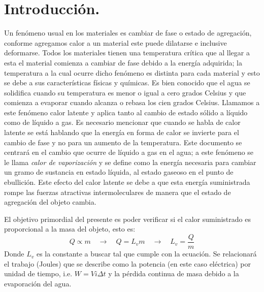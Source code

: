 \documentclass[a4paper]{article}
\begin{document}
\section*{Introducción.}
Un fenómeno usual en los materiales es cambiar de fase o estado de agregación, conforme agregamos calor a un material este puede dilatarse e inclusive deformarse.  Todos los materiales tienen una temperatura crítica que al llegar a esta el material comienza a cambiar de fase debido a la energía adquirida; la temperatura a la cual ocurre dicho fenómeno es distinta para cada material y esto se debe a sus características físicas y químicas. Es bien conocido que el agua se solidifica cuando su temperatura es menor o igual a cero grados Celsius y que comienza a evaporar cuando alcanza o rebasa los cien grados Celsius. Llamamos a este fenómeno calor latente y aplica tanto al cambio de estado sólido a líquido como de líquido a gas. Es necesario mencionar que cuando se habla de calor latente se está hablando que la energía en forma de calor se invierte para el cambio de fase y no para un aumento de la temperatura. Este documento se centrará en el cambio que ocurre de líquido a gas en el agua; a este fenómeno se le llama \textit{calor de vaporización} y se define como la energía necesaria para cambiar un gramo de sustancia en estado líquida, al estado gaseoso en el punto de ebullición. Este efecto del calor latente se debe a que esta energía suministrada rompe las fuerzas atractivas intermoleculares de manera que el estado de agregación del objeto cambia.

El objetivo primordial del presente es poder verificar si el calor suministrado es proporcional a la masa del objeto, esto es:
$$Q \propto m \quad \xrightarrow{} \quad Q=L_v m \quad \xrightarrow{} \quad L_v = \frac{Q}{m}$$
Donde $L_v$ es la constante a buscar tal que cumple con la ecuación. Se relacionará el trabajo (Joules) que se describe como la potencia (en este caso eléctrica) por unidad de tiempo, i.e. $W = Vi\Delta t$ y la pérdida continua de masa debido a la evaporación del agua.

\end{document}
